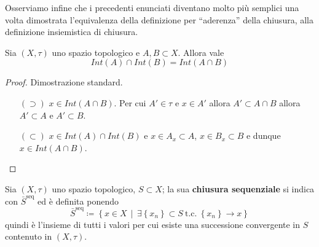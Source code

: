 \begin{remark}
	Osserviamo infine che i precedenti enunciati diventano molto più semplici una volta dimostrata l'equivalenza della definizione per ``aderenza'' della chiusura, alla definizione insiemistica di chiusura.
\end{remark}

\begin{proposition}
	Sia $(X,\tau)$ uno spazio topologico e $A, B \subset X$. Allora vale 
	\begin{equation*}
		Int(A) \cap Int(B) = Int(A \cap B)
	\end{equation*}
\end{proposition}
\begin{proof}
	Dimostrazione standard.
	\begin{enumerate}
		\item[$(\supset)$]  $x \in Int(A \cap B)$. Per cui $A' \in \tau$ e $x \in A'$ allora $A' \subset A \cap B$ allora $A' \subset A$ e $A' \subset B$.  
		\item[$(\subset)$] $x \in Int(A) \cap Int(B)$ e $x \in A_x \subset A$, $x \in B_x \subset B$ e dunque $x \in Int(A \cap B)$.
	\end{enumerate}
\end{proof}


\begin{definition}
	Sia $(X,\tau)$ uno spazio topologico, $S \subset X$; la sua \textbf{chiusura sequenziale} si indica con $\bar{S}^\text{seq}$ ed è definita ponendo
	\begin{equation*}
		\bar{S}^\text{seq} \coloneqq \left\{x \in X \,\middle|\, \exists\left\{x_n\right\} \subset S\ \text{t.c.}\ \left\{x_n\right\} \rightarrow x \right\}
	\end{equation*}
	quindi è l'insieme di tutti i valori per cui esiste una successione convergente in $S$ contenuto in $(X, \tau)$.
\end{definition}

